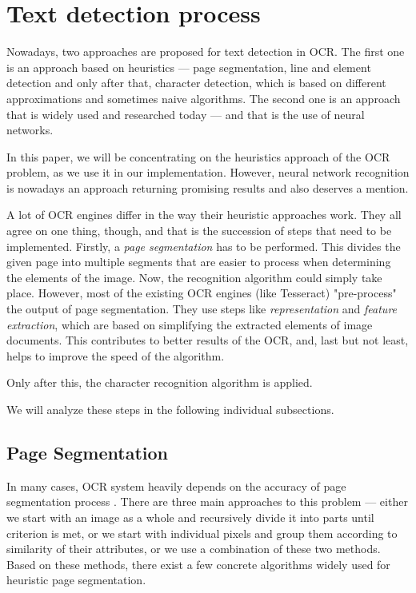 \section{Text detection process}

Nowadays, two approaches are proposed for text detection in OCR. The first one is an approach based on heuristics --- page segmentation, line and element detection and only after that, character detection, which is based on different approximations and sometimes naive algorithms. The second one is an approach that is widely used and researched today --- and that is the use of neural networks.

In this paper, we will be concentrating on the heuristics approach of the OCR problem, as we use it in our implementation. However, neural network recognition is nowadays an approach returning  promising results and also deserves a mention.

A lot of OCR engines differ in the way their heuristic approaches work. They all agree on one thing, though, and that is the succession of steps that need to be implemented. Firstly, a \emph{page segmentation} has to be performed. This divides the given page into multiple segments that are easier to process when determining the elements of the image. Now, the recognition algorithm could simply take place. However, most of the existing OCR engines (like Tesseract) "pre-process" the output of page segmentation. They use steps like \emph{representation} and \emph{feature extraction}, which are based on simplifying the extracted elements of image documents. This contributes to better results of the OCR, and, last but not least, helps to improve the speed of the algorithm.

Only after this, the character recognition algorithm is applied.

We will analyze these steps in the following individual subsections.

\subsection{Page Segmentation}

In many cases, OCR system heavily depends on the accuracy of page segmentation process \citep{pageSegmentation}. There are three main approaches \citep{segmentationBenchmark} to this problem --- either we start with an image as a whole and recursively divide it into parts until criterion is met, or we start with individual pixels and group them according to similarity of their attributes, or we use a combination of these two methods. Based on these methods, there exist a few concrete algorithms widely used for heuristic page segmentation.

